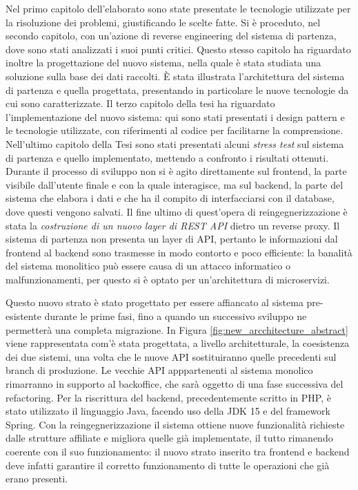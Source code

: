 \documentclass[a4paper,11pt]{article}
\begin{document}
	   Nel primo capitolo dell'elaborato sono state presentate le tecnologie utilizzate per la risoluzione dei problemi, giustificando le scelte fatte. Si è proceduto, nel secondo capitolo, con un'azione di reverse engineering del sistema di partenza, dove sono stati analizzati i suoi punti critici. Questo stesso capitolo ha riguardato inoltre la progettazione del nuovo sistema, nella quale è stata studiata una soluzione sulla base dei dati raccolti. È stata illustrata l'architettura del sistema di partenza e quella progettata, presentando in particolare le nuove tecnologie da cui sono caratterizzate. Il terzo capitolo della tesi ha riguardato l'implementazione del nuovo sistema: qui sono stati presentati i design pattern e le tecnologie utilizzate, con riferimenti al codice per facilitarne la comprensione. Nell'ultimo capitolo della Tesi sono stati presentati alcuni \emph{stress test} sul sistema di partenza e quello implementato, mettendo a confronto i risultati ottenuti. Durante il processo di sviluppo non si è agito direttamente sul frontend, la parte visibile dall’utente finale e con la quale interagisce, ma sul backend, la parte del sistema che elabora i dati e che ha il compito di interfacciarsi con il database, dove questi vengono salvati. Il fine ultimo di quest’opera di reingegnerizzazione è stata la \emph{costruzione di un nuovo layer di REST API} dietro un reverse proxy. Il sistema di partenza non presenta un layer di API, pertanto le informazioni dal frontend al backend sono trasmesse in modo contorto e poco efficiente: la banalità del sistema monolitico può essere causa di un attacco informatico o malfunzionamenti, per questo si è optato per un’architettura di microservizi. 
	   
	   Questo nuovo strato è stato progettato per essere affiancato al sistema pre-esistente durante le prime fasi, fino a quando un successivo sviluppo ne permetterà una completa migrazione. In Figura \ref{fig:new_arcchitecture_abstract} viene rappresentata com'è stata progettata, a livello architetturale, la coesistenza dei due sistemi, una volta che le nuove API sostituiranno quelle precedenti sul branch di produzione. Le vecchie API apppartenenti al sistema monolico rimarranno in supporto al backoffice, che sarà oggetto di una fase successiva del refactoring. Per la riscrittura del backend, precedentemente scritto in PHP, è stato utilizzato il linguaggio Java, facendo uso della JDK 15 e del framework Spring. Con la reingegnerizzazione il sistema ottiene nuove funzionalità richieste dalle strutture affiliate e migliora quelle già implementate, il tutto rimanendo coerente con il suo funzionamento: il nuovo strato inserito tra frontend e backend deve infatti garantire il corretto funzionamento di tutte le operazioni che già erano presenti. 
\end{document}
